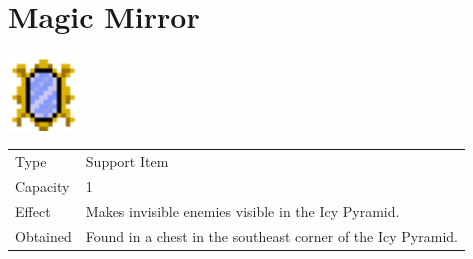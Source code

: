 \section{Magic Mirror}
\label{item:magic_mirror}

\includegraphics[height=2cm,keepaspectratio]{./resources/items/magicmirror}

\begin{longtable}{ l p{9cm} }
	Type
	& Support Item
\\ %
	Capacity
	& 1
\\ %
	Effect
	& Makes invisible enemies visible in the Icy Pyramid.
\\ %
	Obtained
	& Found in a chest in the southeast corner of the Icy Pyramid.
\end{longtable}
